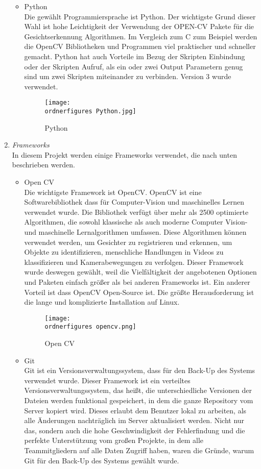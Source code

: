 \begin{enumerate}
\begin{itemize}
			\item Python \\
			Die gewählt Programmiersprache ist Python. Der wichtigste Grund dieser Wahl ist hohe Leichtigkeit der Verwendung der OPEN-CV Pakete für die Gesichtserkennung Algorithmen. Im Vergleich zum C zum Beispiel werden die OpenCV Bibliotheken und Programmen viel praktischer und schneller gemacht. Python hat auch Vorteile im Bezug der Skripten Einbindung oder der Skripten Aufruf, als ein oder zwei Output Parametern genug sind um zwei Skripten miteinander zu verbinden. Version 3 wurde verwendet.
			\begin{figure}[H]
				\texttt{[image: \\ordnerfigures Python.jpg]}
				\centering
				\caption{Python}
			\end{figure}\cite{PythonBild}
		\end{itemize}
	\item \textit{Frameworks} \\
	In diesem Projekt werden einige Frameworks verwendet, die nach unten beschrieben werden.
		\begin{itemize}
			\item Open CV \\
			Die wichtigste Framework ist OpenCV. OpenCV ist eine Softwarebibliothek dass für Computer-Vision und maschinelles Lernen verwendet wurde. Die Bibliothek verfügt über mehr als 2500 optimierte Algorithmen, die sowohl klassische als auch moderne Computer Vision- und maschinelle Lernalgorithmen umfassen. Diese Algorithmen können verwendet werden, um Gesichter zu registrieren und erkennen, um Objekte zu identifizieren, menschliche Handlungen in Videos zu klassifizieren und Kamerabewegungen zu verfolgen. Dieser Framework wurde deswegen gewählt, weil die Vielfältigkeit der angebotenen Optionen und Paketen einfach größer als bei anderen Frameworks ist. Ein anderer Vorteil ist dass OpenCV Open-Source ist. Die größte Herausforderung ist die lange und komplizierte Installation auf Linux.\cite{OpenCV}
			\begin{figure}[H]
				\texttt{[image: \\ordnerfigures opencv.png]}
				\centering
				\caption{Open CV}
			\end{figure}\cite{OpenCVBild}
			\item Git \\
			Git ist ein Versionsverwaltungssystem, dass  für den Back-Up des Systems verwendet wurde. Dieser Framework ist ein verteiltes Versionsverwaltungssystem, das heißt, die unterschiedliche Versionen der Dateien werden funktional gespeichert, in dem die ganze Repository vom Server kopiert wird. Dieses erlaubt dem Benutzer lokal zu arbeiten, als alle Änderungen nachträglich im Server aktualisiert werden. Nicht nur das, sondern auch die hohe Geschwindigkeit der Fehlerfindung und die perfekte Unterstützung vom großen Projekte, in dem alle Teammitgliedern auf alle Daten Zugriff haben, waren die Gründe, warum Git für den Back-Up des Systems gewählt wurde.\cite{Git}

\end{itemize}
\end{enumerate}

